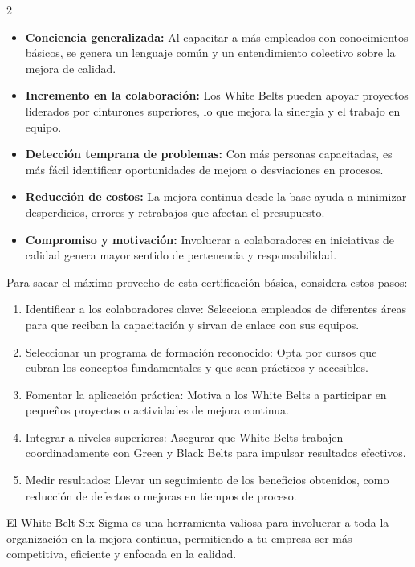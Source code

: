 \documentclass[10pt,a4paper]{article}
\begin{document}
\begin{multicols}{2}
\begin{itemize}[leftmargin=*, noitemsep, topsep=0pt]
    \item \textbf{Conciencia generalizada:} Al capacitar a más empleados con conocimientos básicos, se genera un lenguaje común y un entendimiento colectivo sobre la mejora de calidad.
    \item \textbf{Incremento en la colaboración:} Los White Belts pueden apoyar proyectos liderados por cinturones superiores, lo que mejora la sinergia y el trabajo en equipo.
    \item \textbf{Detección temprana de problemas:} Con más personas capacitadas, es más fácil identificar oportunidades de mejora o desviaciones en procesos.
    \item \textbf{Reducción de costos:} La mejora continua desde la base ayuda a minimizar desperdicios, errores y retrabajos que afectan el presupuesto.
    \item \textbf{Compromiso y motivación:} Involucrar a colaboradores en iniciativas de calidad genera mayor sentido de pertenencia y responsabilidad.
\end{itemize}

Para sacar el máximo provecho de esta certificación básica, considera estos pasos:

\begin{enumerate}[leftmargin=*, noitemsep, topsep=0pt]
    \item Identificar a los colaboradores clave: Selecciona empleados de diferentes áreas para que reciban la capacitación y sirvan de enlace con sus equipos.
    \item Seleccionar un programa de formación reconocido: Opta por cursos que cubran los conceptos fundamentales y que sean prácticos y accesibles.
    \item Fomentar la aplicación práctica: Motiva a los White Belts a participar en pequeños proyectos o actividades de mejora continua.
    \item Integrar a niveles superiores: Asegurar que White Belts trabajen coordinadamente con Green y Black Belts para impulsar resultados efectivos.
    \item Medir resultados: Llevar un seguimiento de los beneficios obtenidos, como reducción de defectos o mejoras en tiempos de proceso.
\end{enumerate}

El White Belt Six Sigma es una herramienta valiosa para involucrar a toda la organización en la mejora continua, permitiendo a tu empresa ser más competitiva, eficiente y enfocada en la calidad.


\end{multicols}
\end{document}
